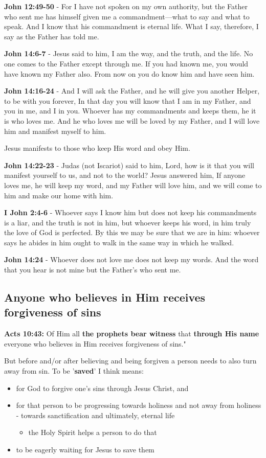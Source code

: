\documentclass[11pt]{article}
\begin{document}
\textbf{John 12:49-50} - For I have not spoken on my own authority, but the Father who sent me has himself given me a commandment—what to say and what to speak. And I know that his commandment is eternal life. What I say, therefore, I say as the Father has told me.

\textbf{John 14:6-7} - Jesus said to him, I am the way, and the truth, and the life. No one comes to the Father except through me. If you had known me, you would have known my Father also. From now on you do know him and have seen him.

\textbf{John 14:16-24} - And I will ask the Father, and he will give you another Helper, to be with you forever, In that day you will know that I am in my Father, and you in me, and I in you. Whoever has my commandments and keeps them, he it is who loves me. And he who loves me will be loved by my Father, and I will love him and manifest myself to him.

Jesus manifests to those who keep His word and obey Him.

\textbf{John 14:22-23} - Judas (not Iscariot) said to him, Lord, how is it that you will manifest yourself to us, and not to the world? Jesus answered him, If anyone loves me, he will keep my word, and my Father will love him, and we will come to him and make our home with him.

\textbf{I John 2:4-6} - Whoever says I know him but does not keep his commandments is a liar, and the truth is not in him, but whoever keeps his word, in him truly the love of God is perfected. By this we may be sure that we are in him: whoever says he abides in him ought to walk in the same way in which he walked.

\textbf{John 14:24} - Whoever does not love me does not keep my words. And the word that you hear is not mine but the Father's who sent me.

\subsection{Anyone who believes in Him receives forgiveness of sins}
\label{sec:orgde33b83}
\textbf{Acts 10:43:} Of Him all \textbf{the prophets bear witness} that \textbf{through His name} everyone who believes in Him receives forgiveness of sins."

But before and/or after believing and being forgiven a person needs to also turn away from sin.
To be '\textbf{saved}' I think means:
\begin{itemize}
\item for God to forgive one's sins through Jesus Christ, and
\item for that person to be progressing towards holiness and not away from holiness - towards sanctification and ultimately, eternal life
\begin{itemize}
\item the Holy Spirit helps a person to do that
\end{itemize}
\item to be eagerly waiting for Jesus to save them
\end{itemize}
\end{document}
